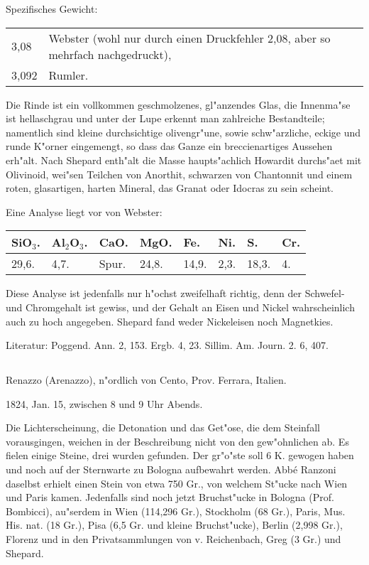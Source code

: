 \documentclass[a4paper, 11pt, oneside]{article}
\begin{document}
Spezifisches Gewicht:
\begin{table}[!ht]
    \centering\swabfamily\Large
    \begin{tabular}{l p{50mm}}
        3,08 & Webster (wohl nur durch einen Druckfehler 2,08, aber so mehrfach nachgedruckt),\\
        3,092 & Rumler.
    \end{tabular}
\end{table}

Die Rinde ist ein vollkommen geschmolzenes, gl"anzendes Glas, die Innenma"se ist hellaschgrau und unter der Lupe erkennt man zahlreiche Bestandteile; namentlich sind kleine durchsichtige olivengr"une, sowie schw"arzliche, eckige und runde K"orner eingemengt, so dass das Ganze ein breccienartiges Aussehen erh"alt. Nach Shepard enth"alt die Masse haupts"achlich Howardit durchs"aet mit Olivinoid, wei"sen Teilchen von Anorthit, schwarzen von Chantonnit und einem roten, glasartigen, harten Mineral, das Granat oder Idocras zu sein scheint.

Eine Analyse liegt vor von Webster:
\begin{table}[!ht]
    \centering\swabfamily\Large
    \begin{tabular}{l l l l l l l l}
        SiO$_{3}$. & Al$_{2}$O$_{3}$. & CaO. & MgO. & Fe. & Ni. & S. & Cr. \\ \hline
        29,6. & 4,7. & Spur. & 24,8. & 14,9. & 2,3. & 18,3. & 4. \\
    \end{tabular}
\end{table}

Diese Analyse ist jedenfalls nur h"ochst zweifelhaft richtig, denn der Schwefel- und Chromgehalt ist gewiss, und der Gehalt an Eisen und Nickel wahrscheinlich auch zu hoch angegeben. Shepard fand weder Nickeleisen noch Magnetkies.

\normalsize
Literatur: Poggend. Ann. 2, 153. Ergb. 4, 23. Sillim. Am. Journ. 2. 6, 407.
\subsection{}
\LARGE
\paragraph{}
Renazzo (Arenazzo), n"ordlich von Cento, Prov. Ferrara, Italien.

1824, Jan. 15, zwischen 8 und 9 Uhr Abends.

Die Lichterscheinung, die Detonation und das Get"ose, die dem Steinfall vorausgingen, weichen in der Beschreibung nicht von den gew"ohnlichen ab. Es fielen einige Steine, drei wurden gefunden. Der gr"o"ste soll 6 K. gewogen haben und noch auf der Sternwarte zu Bologna aufbewahrt werden. Abbé Ranzoni daselbst erhielt einen Stein von etwa 750 Gr., von welchem St"ucke nach Wien und Paris kamen. Jedenfalls sind noch jetzt Bruchst"ucke in Bologna (Prof. Bombicci), au"serdem in Wien (114,296 Gr.), Stockholm (68 Gr.), Paris, Mus. His. nat. (18 Gr.), Pisa (6,5 Gr. und kleine Bruchst"ucke), Berlin (2,998 Gr.), Florenz und in den Privatsammlungen von v. Reichenbach, Greg (3 Gr.) und Shepard.
\end{document}
